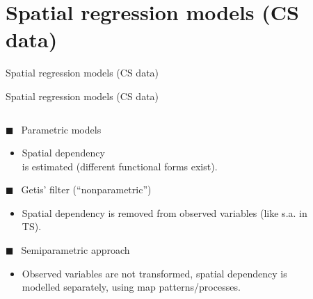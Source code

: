 \documentclass{beamer}
\begin{document}
\section{Spatial regression models (CS data)}
\begin{frame}{Spatial regression models (CS data)}
\end{frame}
\begin{frame}{Spatial regression models (CS data)}
\begin{columns}[T] %
\begin{column}{.48\textwidth}
\vspace{-0.1cm}
$\blacksquare~~$ Parametric models \\
\vspace{-0.1cm}
        \begin{itemize}
        \item Spatial dependency \\is estimated (different functional forms exist).
        \end{itemize}
        \smallskip
$\blacksquare~~$ Getis' filter (``nonparametric'')\\
\vspace{-0.1cm}
        \begin{itemize}
        \item Spatial dependency is removed from observed variables (like s.a. in TS).
        \end{itemize}
        \smallskip
$\blacksquare~~$ Semiparametric approach \\
\vspace{-0.1cm}
        \begin{itemize}
        \item Observed variables are not transformed, spatial dependency is modelled separately, using map patterns/processes.
        \end{itemize}
\end{column}%
\begin{column}{.48\textwidth}
\vspace{-0.1cm}
\begin{figure}
  \centering

\end{figure}
\end{column}
\end{columns}
\end{frame}
\end{document}
